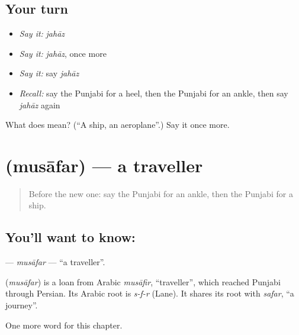 \subsection*{Your turn}
\begin{itemize}
\raggedright
  \item \emph{Say it:} \emph{jahāz}
  \item \emph{Say it:} \emph{jahāz}, once more
  \item \emph{Say it:} say \emph{jahāz}
  \item \emph{Recall:} say the Punjabi for a heel, then the Punjabi for an ankle, then say \emph{jahāz} again
\end{itemize}

\begin{tcolorbox}[breakable,colback=teal!4,colframe=teal!35!black,title={Before you move on}]
What does  mean? (\textquotedblleft{}A ship, an aeroplane\textquotedblright{}.) Say it once more.
\end{tcolorbox}
\section[\texorpdfstring{\pa{ਮੁਸਾਫ਼ਰ} (musāfar)}{ਮੁਸਾਫ਼ਰ (musāfar)}]{ (musāfar) — a traveller}

\label{lesson:PA-C137-musafar}



\begin{quote}
Before the new one: say the Punjabi for an ankle, then the Punjabi for a ship.
\end{quote}

\subsection*{You'll want to know: }
\textbf{} — \emph{musāfar} — \textquotedblleft{}a traveller\textquotedblright{}.

\begin{cousinweb}
\textbf{} (\emph{musāfar}) is a loan from Arabic \emph{musāfir}, \textquotedblleft{}traveller\textquotedblright{}, which reached Punjabi through Persian. Its Arabic root is \emph{s-f-r} (Lane). It shares its root with \emph{safar}, \textquotedblleft{}a journey\textquotedblright{}.
\end{cousinweb}

\begin{grammarlens}[title={What you've built}]
One more word for this chapter.
\end{grammarlens}

